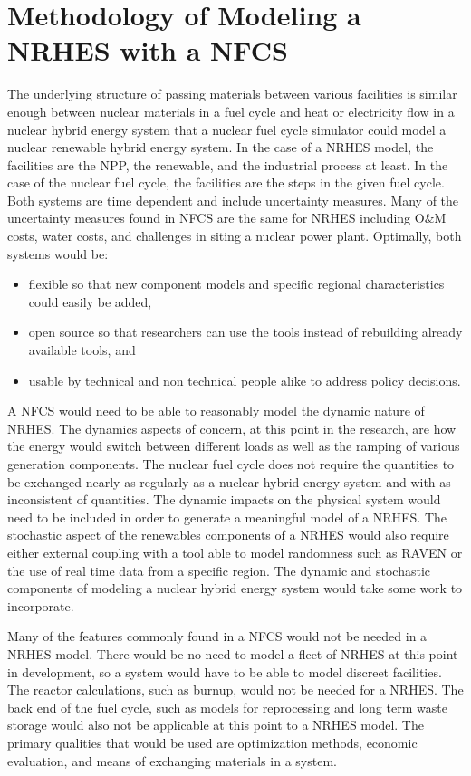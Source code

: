 \documentclass[12pt]{UIdahoMastersThesis}
\begin{document}
\chapter{Methodology of Modeling a NRHES with a NFCS}
The underlying structure of passing materials between various facilities is similar enough between nuclear materials in a fuel cycle and heat or electricity flow in a nuclear hybrid energy system that a nuclear fuel cycle simulator could model a nuclear renewable hybrid energy system. In the case of a NRHES model, the facilities are the NPP, the renewable, and the industrial process at least.  In the case of the nuclear fuel cycle, the facilities are the steps in the given fuel cycle. Both systems are time dependent and include uncertainty measures. Many of the uncertainty measures found in NFCS are the same for NRHES including O\&M costs, water costs, and challenges in siting a nuclear power plant. Optimally, both systems would be: 
\begin{itemize}

\item flexible so that new component models and specific regional characteristics could easily be added, 
\item open source so that researchers can use the tools instead of rebuilding already available tools, and 
\item usable by technical and non technical people alike to address policy decisions. 

\end{itemize}
 
A NFCS would need to be able to reasonably model the dynamic nature of NRHES. The dynamics aspects of concern, at this point in the research, are how the energy would switch between different loads as well as the ramping of various generation components.  The nuclear fuel cycle does not require the quantities to be exchanged nearly as regularly as a nuclear hybrid energy system and with as inconsistent of quantities. The dynamic impacts on the physical system would need to be included in order to generate a meaningful model of a NRHES. The stochastic aspect of the renewables components of a NRHES would also require either external coupling with a tool able to model randomness such as RAVEN or the use of real time data from a specific region. The dynamic and stochastic components of modeling a nuclear hybrid energy system would take some work to incorporate. 

Many of the features commonly found in a NFCS would not be needed in a NRHES model.  There would be no need to model a fleet of NRHES at this point in development, so a system would have to be able to model discreet facilities.  The reactor calculations, such as burnup, would not be needed for a NRHES.  The back end of the fuel cycle, such as models for reprocessing and long term waste storage would also not be applicable at this point to a NRHES model.  The primary qualities that would be used are optimization methods, economic evaluation, and means of exchanging materials in a system. 
\end{document}
